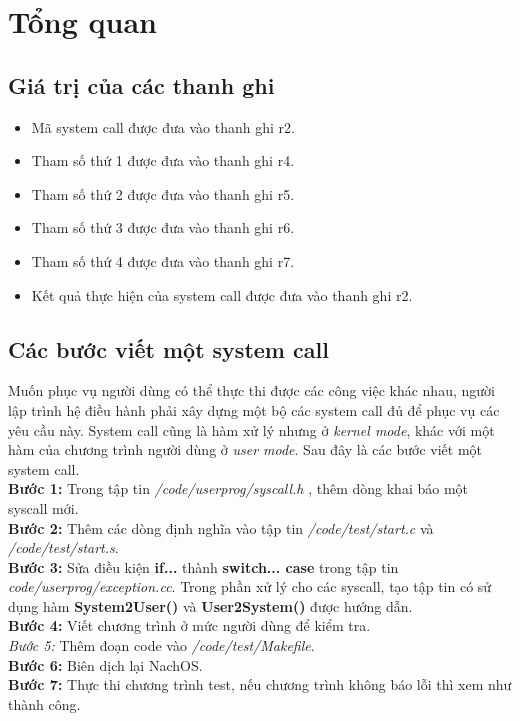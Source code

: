 \section{Tổng quan}
\subsection{Giá trị của các thanh ghi}
\begin{itemize}
\item Mã system call được đưa vào thanh ghi r2.
\item Tham số thứ 1 được đưa vào thanh ghi r4.
\item Tham số thứ 2 được đưa vào thanh ghi r5.
\item Tham số thứ 3 được đưa vào thanh ghi r6.
\item Tham số thứ 4 được đưa vào thanh ghi r7.
\item Kết quả thực hiện của system call được đưa vào thanh ghi r2.
\end{itemize}
\subsection{Các bước viết một system call}
Muốn phục vụ người dùng có thể thực thi được các công việc khác nhau, người lập trình hệ điều hành phải xây dựng một bộ các system call đủ để phục vụ các yêu cầu này. System call cũng là hàm xử lý nhưng ở \textit{kernel mode}, khác với một hàm của chương trình người dùng ở \textit{user mode}. Sau đây là các bước viết một system call.\\
\textbf{Bước 1:} Trong tập tin \textit{/code/userprog/syscall.h
}, thêm dòng khai báo một syscall mới.\\
\textbf{Bước 2:} Thêm các dòng định nghĩa vào tập tin \textit{/code/test/start.c} và \textit{/code/test/start.s}.\\
\textbf{Bước 3:} Sửa điều kiện \textbf{if...} thành \textbf{switch... case} trong tập tin \textit{code/userprog/exception.cc}. Trong phần xử lý cho các syscall, tạo tập tin có sử dụng hàm \textbf{System2User()} và \textbf{User2System()} được hướng dẫn.\\
\textbf{Bước 4:} Viết chương trình ở mức người dùng để kiểm tra.\\
\textit{Bước 5:} Thêm đoạn code vào \textit{/code/test/Makefile}.\\
\textbf{Bước 6:} Biên dịch lại NachOS.\\
\textbf{Bước 7:} Thực thi chương trình test, nếu chương trình không báo lỗi thì xem như thành công.